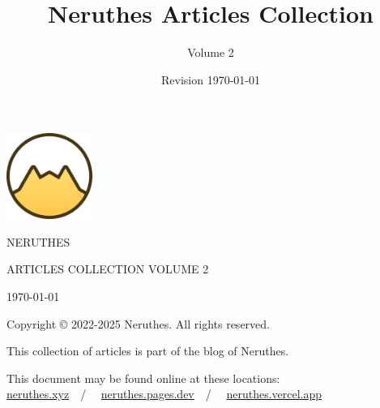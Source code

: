 \documentclass[12pt,a4paper]{report}
\title{Neruthes Articles Collection}
\author{Volume 2}
\date{Revision \today}
\begin{document}
\begin{titlepage}
	\center
	\ttfamily
	\leavevmode
	\vskip 90pt
	\includegraphics[width=28mm]{wwwsrc/neruthes-forceCircle-unpadded.png}\par
	\vskip 50pt
		{\fontsize{24pt}{24pt}\selectfont\MakeUppercase{NERUTHES}}\par\vskip 30pt
		{\normalsize\MakeUppercase{Articles Collection Volume 2}}\par
	\vfill
	\small
	\today\par
\end{titlepage}
\pagestyle{plain}
\tableofcontents\clearpage





\rmfamily








\clearpage\pagestyle{empty}
\leavevmode\vfill
\footnotesize\sffamily
Copyright \copyright{} 2022-2025 Neruthes. All rights reserved.\par
This collection of articles is part of the blog of Neruthes.\par
This document may be found online at these locations:\\
\href{https://neruthes.xyz/articles/Neruthes_articles_vol002.pdf}{neruthes.xyz}~~/~~%
\href{https://neruthes.pages.dev/articles/Neruthes_articles_vol002.pdf}{neruthes.pages.dev}~~/~~%
\href{https://neruthes.vercel.app/articles/Neruthes_articles_vol002.pdf}{neruthes.vercel.app}
\end{document}

